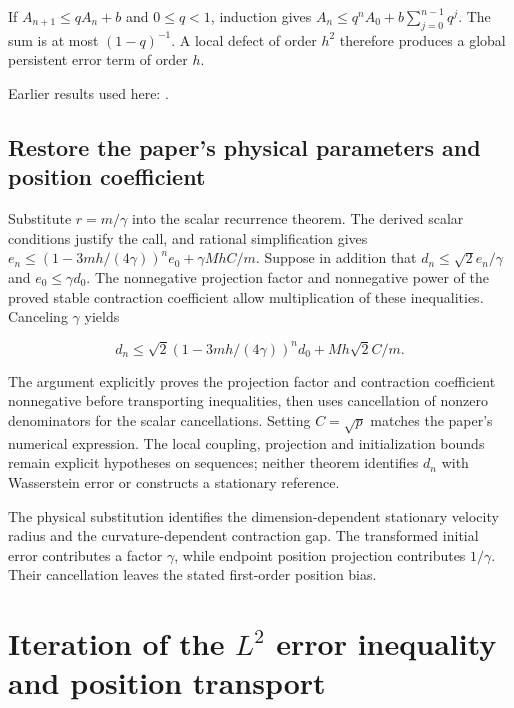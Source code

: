 \documentclass[11pt,a4paper]{report}
\begin{document}
If \(A_{n+1}\le qA_n+b\) and \(0\le q<1\), induction gives \(A_n\le q^nA_0+b\sum_{j=0}^{n-1}q^j\). The sum is at most \((1-q)^{-1}\). A local defect of order \(h^2\) therefore produces a global persistent error term of order \(h\).



Earlier results used here: \cite[Section~3.15.3]{LangevinLean2026ULASC}.
\subsection{\texorpdfstring{Restore the paper’s physical parameters and position coefficient}{Restore the paper’s physical parameters and position coefficient}}
\label{report-step-KineticLangevin-Recurrence-lean-4}


Substitute \(r=m/\gamma\) into the scalar recurrence theorem. The derived scalar conditions justify the call, and rational simplification gives \(e_n\le(1-3mh/(4\gamma))^ne_0+\gamma MhC/m\). Suppose in addition that \(d_n\le\sqrt2e_n/\gamma\) and \(e_0\le\gamma d_0\). The nonnegative projection factor and nonnegative power of the proved stable contraction coefficient allow multiplication of these inequalities. Canceling \(\gamma\) yields

\[d_n\le\sqrt2(1-3mh/(4\gamma))^nd_0+Mh\sqrt2C/m.\]

The argument explicitly proves the projection factor and contraction coefficient nonnegative before transporting inequalities, then uses cancellation of nonzero denominators for the scalar cancellations. Setting \(C=\sqrt p\) matches the paper’s numerical expression. The local coupling, projection and initialization bounds remain explicit hypotheses on sequences; neither theorem identifies \(d_n\) with Wasserstein error or constructs a stationary reference.



The physical substitution identifies the dimension-dependent stationary velocity radius and the curvature-dependent contraction gap. The transformed initial error contributes a factor \(\gamma\), while endpoint position projection contributes \(1/\gamma\). Their cancellation leaves the stated first-order position bias.

\section{\texorpdfstring{Iteration of the \(L^{2}\) error inequality and position transport}{Iteration of the L² error inequality and position transport}}
\label{proof-module-KineticLangevin-LpConvergence-lean}
\end{document}
